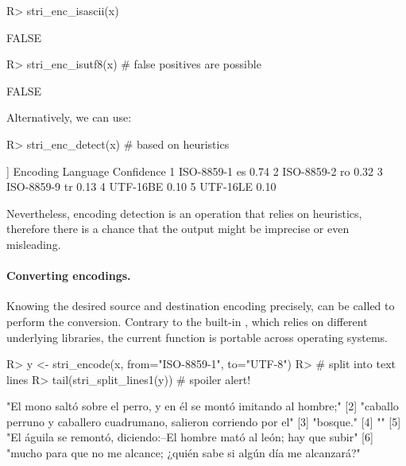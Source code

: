 \documentclass[nojss]{jss}\usepackage[]{graphicx}\usepackage[]{color}
\begin{document}
\begin{Schunk}
\begin{Sinput}
R> stri_enc_isascii(x)
\end{Sinput}
\begin{Soutput}
[1] FALSE
\end{Soutput}
\begin{Sinput}
R> stri_enc_isutf8(x)   # false positives are possible
\end{Sinput}
\begin{Soutput}
[1] FALSE
\end{Soutput}
\end{Schunk}

\noindent
Alternatively, we can use:

\begin{Schunk}
\begin{Sinput}
R> stri_enc_detect(x)  # based on heuristics
\end{Sinput}
\begin{Soutput}
[[1]]
    Encoding Language Confidence
1 ISO-8859-1       es       0.74
2 ISO-8859-2       ro       0.32
3 ISO-8859-9       tr       0.13
4   UTF-16BE                0.10
5   UTF-16LE                0.10
\end{Soutput}
\end{Schunk}

\noindent
Nevertheless, encoding detection is an operation that relies on heuristics,
therefore there is a  chance that the output might be imprecise or even
misleading.




\paragraph{Converting encodings.}
Knowing the desired source and destination encoding precisely,
 can be called to perform the conversion.
Contrary to the built-in , which relies
on different underlying libraries, the current function is portable
across operating systems.


\begin{Schunk}
\begin{Sinput}
R> y <- stri_encode(x, from="ISO-8859-1", to="UTF-8")
R> # split into text lines
R> tail(stri_split_lines1(y))  # spoiler alert!
\end{Sinput}
\begin{Soutput}
[1] "El mono saltó sobre el perro, y en él se montó imitando al hombre;"
[2] "caballo perruno y caballero cuadrumano, salieron corriendo por el"
[3] "bosque."
[4] ""
[5] "El águila se remontó, diciendo:--El hombre mató al león; hay que subir"
[6] "mucho para que no me alcance; ¿quién sabe si algún día me alcanzará?"
\end{Soutput}
\end{Schunk}
\end{document}
